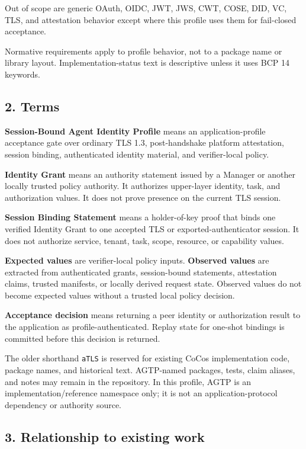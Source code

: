 \documentclass[
]{article}
\begin{document}
Out of scope are generic OAuth, OIDC, JWT, JWS, CWT, COSE, DID, VC, TLS,
and attestation behavior except where this profile uses them for
fail-closed acceptance.

Normative requirements apply to profile behavior, not to a package name
or library layout. Implementation-status text is descriptive unless it
uses BCP 14 keywords.

\subsection{2. Terms}\label{terms}

\textbf{Session-Bound Agent Identity Profile} means an
application-profile acceptance gate over ordinary TLS 1.3,
post-handshake platform attestation, session binding, authenticated
identity material, and verifier-local policy.

\textbf{Identity Grant} means an authority statement issued by a Manager
or another locally trusted policy authority. It authorizes upper-layer
identity, task, and authorization values. It does not prove presence on
the current TLS session.

\textbf{Session Binding Statement} means a holder-of-key proof that
binds one verified Identity Grant to one accepted TLS or
exported-authenticator session. It does not authorize service, tenant,
task, scope, resource, or capability values.

\textbf{Expected values} are verifier-local policy inputs.
\textbf{Observed values} are extracted from authenticated grants,
session-bound statements, attestation claims, trusted manifests, or
locally derived request state. Observed values do not become expected
values without a trusted local policy decision.

\textbf{Acceptance decision} means returning a peer identity or
authorization result to the application as profile-authenticated. Replay
state for one-shot bindings is committed before this decision is
returned.

The older shorthand \texttt{aTLS} is reserved for existing CoCos
implementation code, package names, and historical text. AGTP-named
packages, tests, claim aliases, and notes may remain in the repository.
In this profile, AGTP is an implementation/reference namespace only; it
is not an application-protocol dependency or authority source.

\subsection{3. Relationship to existing
work}\label{relationship-to-existing-work}
\end{document}
